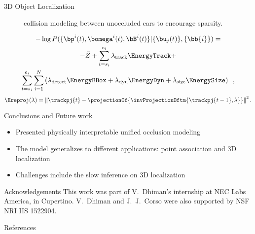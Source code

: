 \documentclass[handout,final]{beamer}
\newlength{\onecolwid}
\begin{document}
\begin{frame}[t]
\begin{columns}[t]
\begin{column}{\onecolwid}
\begin{block}{3D Object Localization}
\begin{figure}
{            collision modeling between unoccluded cars to encourage sparsity.
          }
          \label{fig:graphmodel}
        \end{figure}
        \begin{multline*}
          -\log{P(\{ \bp^i(t) , \bomega^i(t) , \bB^i(t) \} | \{\bu_j(t)\} , \{\bb{i}\} )} = \\
          -\tilde{Z} 
          + \sum_{t=s_i}^{e_i} \lambda_{\text{track}}\EnergyTrack
          + \\ 
          \sum_{t=s_i}^{e_i} \sum_{i=1}^N  
          \left(
            \lambda_{\text{detect}}\EnergyBBox
            + \lambda_{\text{dyn}}\EnergyDyn    
            + \lambda_{\text{size}}\EnergySize
          \right)
          \enspace,
        \end{multline*}
        \begin{equation}
          \Ereproj(\lambda) = \left\|\trackpj{t} - \projectionOf{\invProjectionOftm{\trackpj{t-1}, \lambda}}\right\|^2.
          \label{eq:reprojerror}
        \end{equation}

      \end{block}
      \vspace{0.5in}
      \begin{block}{Conclusions and Future work}
        \begin{itemize}
          \item Presented physically interpretable unified occlusion modeling
          \item The model generalizes to different applications: point association and 3D localization
          \item Challenges include the slow inference on 3D localization
        \end{itemize}
      \end{block}
      \vspace{0.5in}
      \begin{block}{Acknowledgements}
        This work was part of V.~Dhiman's internship at NEC Labs America, in Cupertino. V.~Dhiman and J.~J.~Corso were also supported by NSF NRI IIS 1522904.
      \end{block}
      \begin{block}{References}
        
        
      \end{block}
    \end{column}
  \end{columns}
\end{frame}
\end{document}
